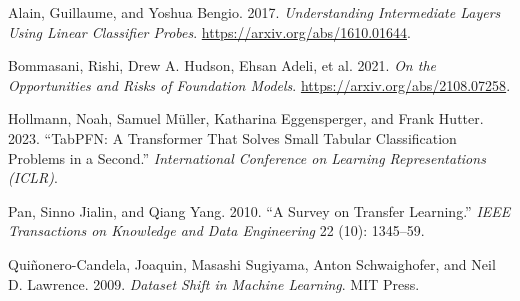 \rujukanheading

\protect{}\label{refs}
\begin{CSLReferences}{1}{1}
Alain, Guillaume, and Yoshua Bengio. 2017. \emph{Understanding Intermediate Layers Using Linear Classifier Probes}. \url{https://arxiv.org/abs/1610.01644}.

{Bommasani, Rishi, Drew A. Hudson, Ehsan Adeli, et al.} 2021. \emph{On the Opportunities and Risks of Foundation Models}. \url{https://arxiv.org/abs/2108.07258}.

Hollmann, Noah, Samuel Müller, Katharina Eggensperger, and Frank Hutter. 2023. {``{TabPFN}: A Transformer That Solves Small Tabular Classification Problems in a Second.''} \emph{International Conference on Learning Representations (ICLR)}.

Pan, Sinno Jialin, and Qiang Yang. 2010. {``A Survey on Transfer Learning.''} \emph{IEEE Transactions on Knowledge and Data Engineering} 22 (10): 1345--59.

Quiñonero-Candela, Joaquin, Masashi Sugiyama, Anton Schwaighofer, and Neil D. Lawrence. 2009. \emph{Dataset Shift in Machine Learning}. MIT Press.

\end{CSLReferences}

